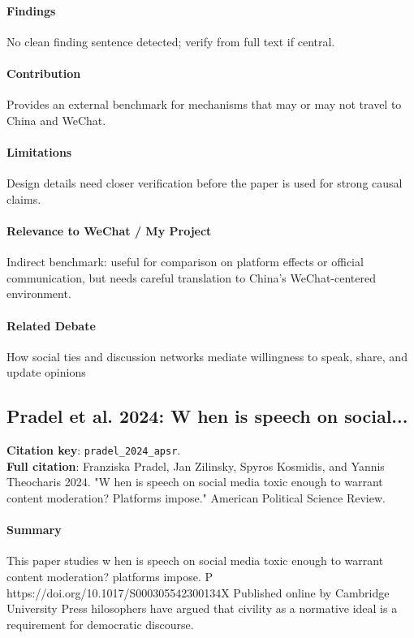 \documentclass[12pt]{article}
\begin{document}
\paragraph{Findings} No clean finding sentence detected; verify from full text if central.

\paragraph{Contribution} Provides an external benchmark for mechanisms that may or may not travel to China and WeChat.

\paragraph{Limitations} Design details need closer verification before the paper is used for strong causal claims.

\paragraph{Relevance to WeChat / My Project} Indirect benchmark: useful for comparison on platform effects or official communication, but needs careful translation to China's WeChat-centered environment.

\paragraph{Related Debate} How social ties and discussion networks mediate willingness to speak, share, and update opinions


\subsection{Pradel et al. 2024: W hen is speech on social...}
\textbf{Citation key}: \texttt{pradel\_2024\_apsr}.\\
\textbf{Full citation}: Franziska Pradel, Jan Zilinsky, Spyros Kosmidis, and Yannis Theocharis 2024. "W hen is speech on social media toxic enough to warrant content moderation? Platforms impose." American Political Science Review.

\paragraph{Summary} This paper studies w hen is speech on social media toxic enough to warrant content moderation? platforms impose. P https://doi.org/10.1017/S000305542300134X Published online by Cambridge University Press hilosophers have argued that civility as a normative ideal is a requirement for democratic discourse.
\end{document}
